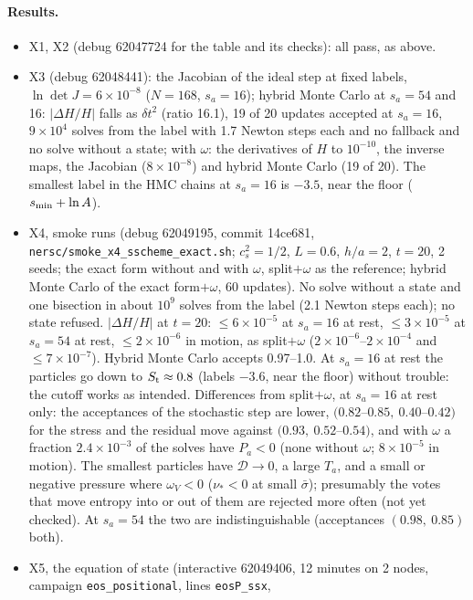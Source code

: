 \documentclass[11pt,aps,preprint,nofootinbib,superscriptaddress,tightenlines]{revtex4-2}
\let\oldparagraph\paragraph
\renewcommand{\paragraph}{\par\bigskip\oldparagraph}
\begin{document}
\paragraph{Results.}
\begin{itemize}
\item X1, X2 (debug 62047724 for the table and its checks): all pass, as above.
\item X3 (debug 62048441): the Jacobian of the ideal step at fixed labels, $\ln\det J=6\times10^{-8}$ ($N=168$, $s_a=16$); hybrid Monte Carlo at
  $s_a=54$ and 16: $|\Delta H/H|$ falls as $\delta t^2$ (ratio 16.1), 19 of 20 updates accepted at $s_a=16$, $9\times10^4$ solves from the label with 1.7
  Newton steps each and no fallback and no solve without a state; with $\omega$: the derivatives of $H$ to $10^{-10}$, the inverse maps, the Jacobian
  ($8\times10^{-8}$) and hybrid Monte Carlo (19 of 20).  The smallest label in the HMC chains at $s_a=16$ is $-3.5$, near the floor
  ($s_{\rm min}+\ln A$).
\item X4, smoke runs (debug 62049195, commit 14ce681, \nolinkurl{nersc/smoke_x4_sscheme_exact.sh}; $c_s^2=1/2$, $L=0.6$, $h/a=2$, $t=20$, 2 seeds; the exact
  form without and with $\omega$, split$+\omega$ as the reference; hybrid Monte Carlo of the exact form$+\omega$, 60 updates).  No solve without a state
  and one bisection in about $10^9$ solves from the label (2.1 Newton steps each); no state refused.  $|\Delta H/H|$ at $t=20$: $\le6\times10^{-5}$ at
  $s_a=16$ at rest, $\le3\times10^{-5}$ at $s_a=54$ at rest, $\le2\times10^{-6}$ in motion, as split$+\omega$ ($2\times10^{-6}$--$2\times10^{-4}$ and
  $\le7\times10^{-7}$).  Hybrid Monte Carlo accepts 0.97--1.0.  At $s_a=16$ at rest the particles go down to $S_{\rm t}\approx0.8$ (labels $-3.6$, near the
  floor) without trouble: the cutoff works as intended.  Differences from split$+\omega$, at $s_a=16$ at rest only: the acceptances of the stochastic
  step are lower, $(0.82$--$0.85,\ 0.40$--$0.42)$ for the stress and the residual move against $(0.93,\ 0.52$--$0.54)$, and with $\omega$ a fraction
  $2.4\times10^{-3}$ of the solves have $P_a<0$ (none without $\omega$; $8\times10^{-5}$ in motion).  The smallest particles have $\mathcal D\to0$, a
  large $T_a$, and a small or negative pressure where $\omega_V<0$ ($\nu_*<0$ at small $\bar\sigma$); presumably the votes that move entropy into or out of them are rejected more often (not yet checked).  At $s_a=54$
  the two are indistinguishable (acceptances $(0.98,\ 0.85)$ both).
\item X5, the equation of state (interactive 62049406, 12 minutes on 2 nodes, campaign \texttt{eos\_positional}, lines \texttt{eosP\_ssx},

\end{itemize}
\end{document}
